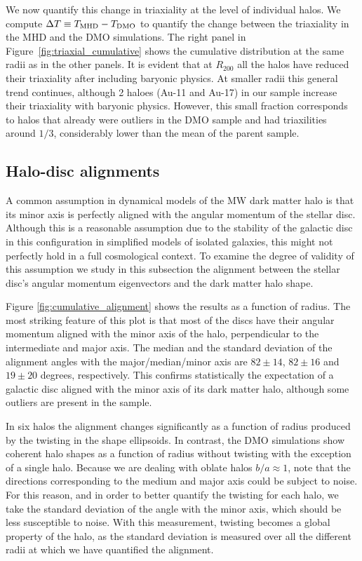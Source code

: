 \documentclass[usenatbib]{mnras}
\begin{document}
We now quantify this change in triaxiality at the level of individual halos.
We compute $\Delta T\equiv T_{\rm MHD}-T_{\rm DMO}$ to quantify the
change between the triaxiality in the MHD and the DMO simulations.
The right panel in Figure~\ref{fig:triaxial_cumulative} shows
the cumulative distribution at the same radii as in the other panels.
It is evident that at $R_{200}$ all the halos have
reduced their triaxiality after including baryonic physics.
At smaller radii this general trend continues, although 2 haloes
(Au-11 and Au-17)  in our sample increase their triaxiality with baryonic physics. 
However, this small fraction corresponds to halos that already were
outliers in the DMO sample and had triaxilities around $1/3$,
considerably lower than the mean of the parent sample.


\subsection{Halo-disc alignments}

A common assumption in dynamical models of the MW dark matter halo is that
its minor axis is perfectly aligned with the angular momentum of the
stellar disc. 
Although this is a reasonable assumption due to the stability of
the galactic disc in this configuration in simplified models of isolated galaxies, this
might not perfectly hold in a full cosmological context. 
To examine the degree of validity of this assumption we study in this
subsection the alignment between the stellar disc's angular momentum
eigenvectors and the dark matter halo shape.

Figure \ref{fig:cumulative_alignment} shows the
results as a function of radius.
The most striking feature of this plot is that most of the discs have
their angular momentum aligned with the minor axis of the halo,
perpendicular to the intermediate and major axis. 
The median and the standard deviation of the alignment angles with
the major/median/minor axis are $82\pm14$, $82\pm16$ and $19\pm20$
degrees, respectively.
This confirms statistically the expectation of a galactic disc aligned
with the minor axis of its dark matter halo, although some outliers
are present in the sample.

In six halos the alignment changes significantly as a
function of radius produced by the twisting in the shape ellipsoids. 
In contrast, the DMO simulations show coherent halo shapes as a
function of radius without twisting with the exception of a single halo. 
Because we are dealing with oblate halos $b/a\approx 1$, note that the
directions corresponding to the medium and major axis could be subject
to noise. 
For this reason, and in order to better quantify the twisting for each
halo, we take the standard deviation of the angle with the minor
axis, which should be less susceptible to noise.
With this measurement, twisting becomes a global property of the halo,
as the standard deviation is measured over all the different radii at
which we have quantified the alignment.
\end{document}
